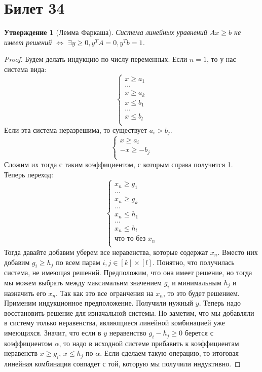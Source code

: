 \documentclass[12pt, letterpaper]{article}
\newtheorem{prop}{Утверждение}[section]
\begin{document}
\section{Билет 34}
\begin{prop}[Лемма Фаркаша]
Система линейных уравнений $Ax \geq b$ не имеет решений $\Longleftrightarrow$ $\exists y \geq 0, y^T A = 0, y^T b = 1$. 
\end{prop}
\begin{proof}
Будем делать индукцию по числу переменных. Если $n=1$, то у нас система вида:
$$
\begin{cases}
x \geq a_1 \\
\ldots \\
x \geq a_k \\
x \leq b_1 \\
\ldots \\
x \leq b_l \\
\end{cases}
$$
Если эта система неразрешима, то существует $a_i > b_j$.
$$
\begin{cases}
x \geq a_i\\
-x \geq -b_j\\
\end{cases}
$$
Сложим их тогда с таким коэффициентом, с которым справа получится 1.\\
Теперь переход:
$$
\begin{cases}
x_n \geq g_1 \\
\ldots \\
x_n \geq g_k \\
\ldots \\
x_n \leq h_1 \\
\ldots \\
x_n \leq h_l \\
\text{что-то без } x_n \\
\end{cases}
$$
Тогда давайте добавим уберем все неравенства, которые содержат $x_n$. Вместо них добавим $g_i \geq h_j$ по всем парам $i, j \in [k] \times [l]$. Понятно, что получилась система, не имеющая решений. Предположим, что она имеет решение, но тогда мы можем выбрать между максимальнм значением $g_i$ и минимальным $h_j$ и назначить его $x_n$. Так как это все огранчения на $x_n$, то это будет решением. \\
Применим индукционное предположение. Получили нужный $y$. Теперь надо восстановить решение для изначальной системы. Но заметим, что мы добавляли в систему только неравенства, являющиеся линейной комбинацией уже имеющихся. Значит, что если в $y$ неравенство $g_i - h_j \geq 0$ берется с коэффициентом $\alpha$, то надо в исходной системе прибавить к коэффициентам неравенств $x \geq g_i$, $x \leq h_j$ по $\alpha$. Если сделаем такую операцию, то итоговая линейная комбинация совпадет с той, которую мы получили индуктивно. 
\end{proof}
\end{document}
